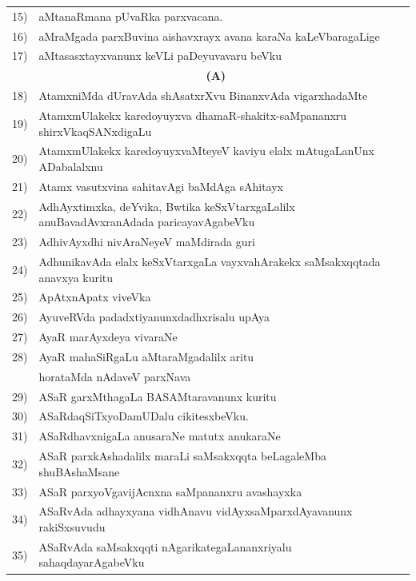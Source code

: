{\begin{longtable}{@{}cp{7.4cm}r}
15) & aMtanaRmana pUvaRka parxvacana. & \pageref{page83}\\
16) & aMraMgada parxBuvina aishavxrayx avana karaNa kaLeVbaragaLige  & \pageref{page190}\\
17) & aMtasasxtayxvanunx keVLi paDeyuvavaru beVku & \pageref{page108}\\ 
    &   \multicolumn{1}{c}{\textbf{(A)}} & \\    
18) & AtamxniMda dUravAda shAsatxrXvu BinanxvAda vigarxhadaMte &   \pageref{page188}\\
19) & AtamxmUlakekx karedoyuyxva dhamaR-shakitx-saMpananxru shirxVkaqSANxdigaLu &   \pageref{page237}\\
20) & AtamxmUlakekx karedoyuyxvaMteyeV kaviyu elalx mAtugaLanUnx ADabalalxnu &   \pageref{page237}\\
21) & Atamx vasutxvina sahitavAgi baMdAga sAhitayx & \pageref{page196}\\
22) & AdhAyxtimxka, deYvika, Bwtika keSxVtarxgaLalilx anuBavadAvxranAdada paricayavAgabeVku & \pageref{page127}\\
23) & AdhivAyxdhi nivAraNeyeV maMdirada guri & \pageref{page67}\\
24) & AdhunikavAda elalx keSxVtarxgaLa vayxvahArakekx saMsakxqqtada anavxya kuritu & \pageref{page36b}\\
25) & ApAtxnApatx viveVka & \pageref{page173}\\
26) & AyuveRVda padadxtiyanunxdadhxrisalu upAya & \pageref{page50b}\\
27) & AyaR marAyxdeya vivaraNe & \pageref{page90}\\
28) & AyaR mahaSiRgaLu aMtaraMgadalilx aritu &   \\
    & horataMda nAdaveV parxNava   & \pageref{page138}\\
29) & ASaR garxMthagaLa BASAMtaravanunx kuritu  & \pageref{page30c}\\
30) & ASaRdaqSiTxyoDamUDalu cikitesxbeVku. & \pageref{page61}\\
31) & ASaRdhavxnigaLa anusaraNe matutx anukaraNe & \pageref{page120}\\
32) & ASaR parxkAshadalilx maraLi saMsakxqqta beLagaleMba shuBAshaMsane & \pageref{page62}\\
33) & ASaR parxyoVgavijAcnxna saMpananxru avashayxka & \pageref{page54}\\
34) & ASaRvAda adhayxyana vidhAnavu vidAyxsaMparxdAyavanunx rakiSxsuvudu & \pageref{page48}\\
35) & ASaRvAda saMsakxqqti nAgarikategaLananxriyalu sahaqdayarAgabeVku & \pageref{page51a}\\

\end{longtable}}
